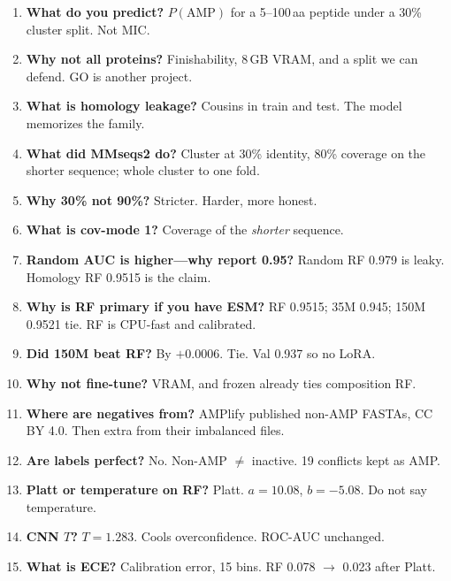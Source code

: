 \documentclass[11pt,a4paper]{report}
\begin{document}
\begin{enumerate}[leftmargin=1.6em]
\item \textbf{What do you predict?} $P(\mathrm{AMP})$ for a 5--100\,aa peptide under a 30\% cluster split. Not MIC.

\item \textbf{Why not all proteins?} Finishability, 8\,GB VRAM, and a split we can defend. GO is another project.

\item \textbf{What is homology leakage?} Cousins in train and test. The model memorizes the family.

\item \textbf{What did MMseqs2 do?} Cluster at 30\% identity, 80\% coverage on the shorter sequence; whole cluster to one fold.

\item \textbf{Why 30\% not 90\%?} Stricter. Harder, more honest.

\item \textbf{What is cov-mode 1?} Coverage of the \emph{shorter} sequence.

\item \textbf{Random AUC is higher---why report 0.95?} Random RF 0.979 is leaky. Homology RF 0.9515 is the claim.

\item \textbf{Why is RF primary if you have ESM?} RF 0.9515; 35M 0.945; 150M 0.9521 tie. RF is CPU-fast and calibrated.

\item \textbf{Did 150M beat RF?} By $+$0.0006. Tie. Val 0.937 so no LoRA.

\item \textbf{Why not fine-tune?} VRAM, and frozen already ties composition RF.

\item \textbf{Where are negatives from?} AMPlify published non-AMP FASTAs, CC BY 4.0. Then extra from their imbalanced files.

\item \textbf{Are labels perfect?} No. Non-AMP $\neq$ inactive. 19 conflicts kept as AMP.

\item \textbf{Platt or temperature on RF?} Platt. $a=10.08$, $b=-5.08$. Do not say temperature.

\item \textbf{CNN $T$?} $T=1.283$. Cools overconfidence. ROC-AUC unchanged.

\item \textbf{What is ECE?} Calibration error, 15 bins. RF 0.078 $\rightarrow$ 0.023 after Platt.


\end{enumerate}
\end{document}
